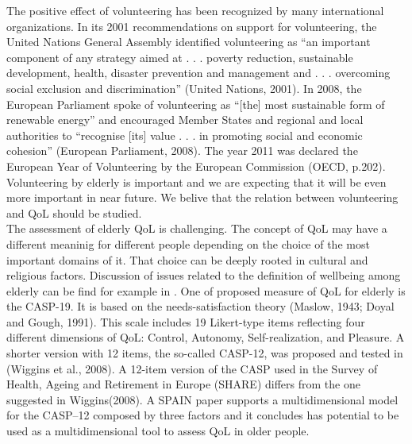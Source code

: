 \documentclass[10pt, letterpaper]{article}
\begin{document}
\begin{spacing}{1.4}
The positive effect of volunteering has been recognized by many international organizations. In its 2001 recommendations on support for volunteering, the United Nations General Assembly identified volunteering as “an important
component of any strategy aimed at . . . poverty reduction, sustainable development, health, disaster prevention and management and . . . overcoming social exclusion and discrimination” (United Nations, 2001). In 2008, the European Parliament spoke of volunteering as “[the] most sustainable form of renewable energy” and encouraged Member States and regional and local authorities to “recognise
[its] value . . . in promoting social and economic cohesion” (European Parliament, 2008). The year 2011 was declared the European Year of Volunteering by the European Commission (OECD, p.202). Volunteering by elderly is important and we are expecting that it will be even more important in near future. We belive that the relation between volunteering and QoL should be studied. \\

The assessment of elderly QoL is challenging. The concept of QoL may have a different meaninig for different people depending on the choice of the most important domains of it. That choice can be deeply rooted in cultural and religious factors. Discussion of issues related to the definition of wellbeing among elderly can be find for example in \citet{nrc2001}.  One of proposed measure of QoL for elderly is the CASP-19. It is based on the needs-satisfaction theory (Maslow, 1943; Doyal and Gough, 1991). This scale includes 19 Likert-type items reflecting four different dimensions of QoL: Control, Autonomy, Self-realization, and Pleasure. A shorter version with 12 items, the so-called CASP-12, was proposed and tested in (Wiggins et al., 2008). A 12-item version of the CASP used in the Survey of Health, Ageing and Retirement in Europe (SHARE) differs from the one suggested in Wiggins(2008). A SPAIN paper supports a multidimensional model for the CASP–12 composed by three factors and it concludes has potential to be used as a multidimensional tool to assess QoL in older people. \\


\end{spacing}
\end{document}

